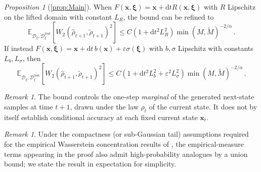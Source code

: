 \documentclass{article}
\theoremstyle{plain}
\theoremstyle{definition}
\theoremstyle{remark}
\newtheorem{remark}[theorem]{Remark}
\newtheorem*{reprop}{Proposition}
\newcommand{\bfxi}{{\bm \xi}}
\newcommand{\x}{\bm{x}}
\newcommand{\bfx}{\bm{x}}
\newcommand{\rd}{\mathrm{d}}
\begin{document}
\begin{reprop}[\ref{prop:Main}]
  When $F(\x, \bfxi) = \x + \rd t R(\x, \bfxi)$ with $R$ Lipschitz on the lifted domain with constant $L_R$, the bound can be refined to
  \begin{equation}
    \mathbb E_{\mathcal{D}_{\xi}, \mathcal{D}_{\xi}^{\text{test}}} \left[ W_2( \hat{\rho}_{t + 1}, \tilde \rho_{t+1} )^2 \right] \leq C ( 1 + \rd t^2 L_R^2 ) {\min(M, \tilde M)}^{-2/\alpha}\,.
  \end{equation}
  If instead $F(\x, \bfxi) = \x + \rd t \, b(\x) + \varepsilon \sigma( \bfxi)$ with $b, \sigma$ Lipschitz with constants $L_b, L_\sigma$, then
  \begin{equation}
    \mathbb E_{\mathcal{D}_{\xi}, \mathcal{D}_{\xi}^{\text{test}}} \left[ W_2( \hat{\rho}_{t + 1}, \tilde \rho_{t+1} )^2 \right] \leq C ( 1 + \rd t^2 L_b^2 + \varepsilon^2 L_\sigma^2 ) {\min(M, \tilde M)}^{-2/\alpha}\,.
  \end{equation}
\end{reprop}

\begin{remark}
  The bound controls the one-step \emph{marginal} of the generated next-state samples at time $t+1$, drawn under the law $\rho_t$ of the current state. It does not by itself establish conditional accuracy at each fixed current state $\bfx_t$.
\end{remark}

\begin{remark}
  Under the compactness (or sub-Gaussian tail) assumptions required for the empirical Wasserstein concentration results of \cite{weed_sharp_2019}, the empirical-measure terms appearing in the proof also admit high-probability analogues by a union bound; we state the result in expectation for simplicity.
\end{remark}
\end{document}

